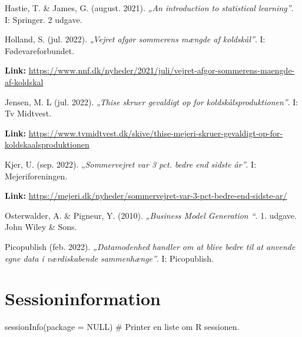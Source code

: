 \documentclass[
  12pt,
  a4paper,
  DIV=11,
  numbers=noendperiod]{scrartcl}
\newenvironment{Shaded}{\begin{snugshade}}{\end{snugshade}}
\newcommand{\AttributeTok}[1]{\textcolor[rgb]{0.40,0.45,0.13}{#1}}
\newcommand{\CommentTok}[1]{\textcolor[rgb]{0.37,0.37,0.37}{#1}}
\newcommand{\ConstantTok}[1]{\textcolor[rgb]{0.56,0.35,0.01}{#1}}
\newcommand{\FunctionTok}[1]{\textcolor[rgb]{0.28,0.35,0.67}{#1}}
\newcommand{\NormalTok}[1]{\textcolor[rgb]{0.00,0.23,0.31}{#1}}
\begin{document}
Hastie, T. \& James, G. (august. 2021). \emph{„An introduction to
statistical learning''}. I: Springer. 2 udgave.

Holland, S. (jul. 2022). \emph{„Vejret afgør sommerens mængde af
koldskål''}. I: Fødevareforbundet.

\textbf{Link:}
\url{https://www.nnf.dk/nyheder/2021/juli/vejret-afgor-sommerens-maengde-af-koldskal}

Jensen, M. L (jul. 2022). \emph{„Thise skruer gevaldigt op for
koldskålsproduktionen''}. I: Tv Midtvest.

\textbf{Link:}
\url{https://www.tvmidtvest.dk/skive/thise-mejeri-skruer-gevaldigt-op-for-koldskaalsproduktionen}

Kjer, U. (sep. 2022). „\emph{Sommervejret var 3 pct. bedre end sidste
år''}. I: Mejeriforeningen.

\textbf{Link:}
\url{https://mejeri.dk/nyheder/sommervejret-var-3-pct-bedre-end-sidste-ar/}

Osterwalder, A. \& Pigneur, Y. (2010). \emph{„Business Model Generation
``}. 1. udgave. John Wiley \& Sons.

Picopublish (feb. 2022). \emph{„Datamodenhed handler om at blive bedre
til at anvende egne data i værdiskabende sammenhænge''}. I: Picopublish.

\hypertarget{sessioninformation}{%
\section{Sessioninformation}\label{sessioninformation}}

\begin{Shaded}
\begin{Highlighting}[numbers=left,,]
\FunctionTok{sessionInfo}\NormalTok{(}\AttributeTok{package =} \ConstantTok{NULL}\NormalTok{) }\CommentTok{\# Printer en liste om R sessionen.}
\end{Highlighting}
\end{Shaded}
\end{document}
